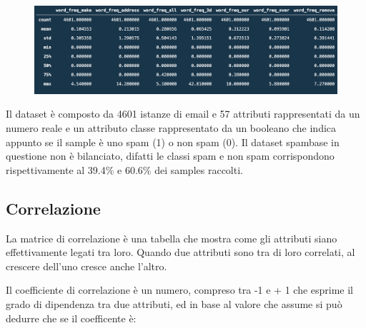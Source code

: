\documentclass[12pt,a4paper]{article}
\begin{document}
\begin{figure}[h]
    \includegraphics[width=1\columnwidth]{pandas_describe.png}
    \caption{}
\end{figure}
Il dataset è composto da 4601 istanze di email e 57 attributi rappresentati da un numero reale e un attributo classe rappresentato da un booleano che indica appunto se il sample è uno spam (1) o non spam (0).
Il dataset spambase in questione non è bilanciato, difatti le classi spam e non spam corrispondono rispettivamente al 39.4\% e 60.6\% dei samples raccolti.

\subsection{Correlazione}
La matrice di correlazione è una tabella che mostra come gli attributi  siano effettivamente legati tra loro. Quando due attributi sono tra di loro correlati, al crescere dell’uno cresce anche l’altro.

Il coefficiente di correlazione è un numero, compreso tra -1 e + 1 che esprime il grado di dipendenza tra due attributi, ed in base al valore che assume si può dedurre che se il coefficente è:
\end{document}
